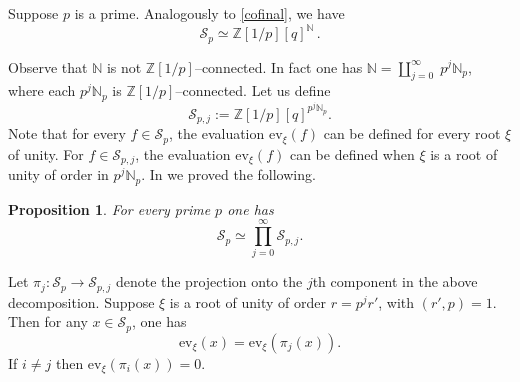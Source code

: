 \documentclass[12pt]{amsart}
\theoremstyle{plain}
\newtheorem{proposition}[Thm]{Proposition}%
\theoremstyle{definition}
\def\BZ{\mathbb Z}
\def\N{{\mathbb N}}
\def\R{\mathcal R}
\def\calS{\mathcal S}
\def\Z{\BZ}
\def\ev{\mathrm{ev}}
\begin{document}
Suppose $p$ is a prime. Analogously to \eqref{cofinal},
we have
$$\calS_p \simeq \Z[1/p][q]^\N\,.$$

Observe that $\N$ is not $\Z[1/p]$--connected. In fact one has
 $\N =\amalg_{j=0}^\infty \; p^j \N_p$, where each $p^j\N_p$ is
$\Z[1/p]$--connected.
Let us define
\[
\calS_{p,j}:= \Z[1/p][q]^{p^j \N_p}.
\]
Note that for every $f \in \calS_p$, the evaluation $\ev_\xi(f)$ can be
 defined for every root $\xi$ of unity. For $f\in \calS_{p,j}$, the evaluation
$\ev_\xi(f)$ can be defined  when $\xi$ is a root of unity of order
in $p^j\N_p$. In \cite{BBL} we proved the following.



\begin{proposition} For every prime $p$ one has
\begin{equation} \calS_p\simeq \prod_{j=0}^\infty \calS_{p,j}.
\label{0912}\end{equation}

\end{proposition}

Let $\pi_j: \calS_p \to \calS_{p,j}$ denote the projection onto the
$j$th component in the above decomposition.
Suppose $\xi$ is a root of unity of order $r= p^j r'$,
with $(r',p)=1$. Then
for any $x\in \calS_p$, one has
$$ \ev_\xi(x) = \ev_\xi(\pi_j(x)).$$
If $i\neq j$ then $\ev_\xi(\pi_i(x))=0$.
















\end{document}
